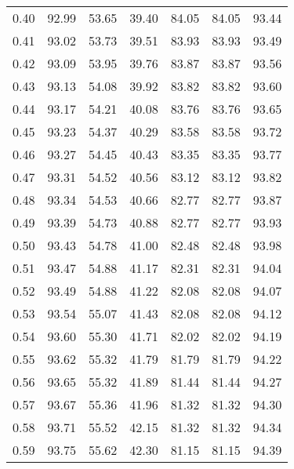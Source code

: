 \begin{tabular}{|c|c|c|c|c|c|c|}
      0.40 &     92.99 &     53.65 &      39.40 &   84.05 &      84.05 &         93.44 \\
      0.41 &     93.02 &     53.73 &      39.51 &   83.93 &      83.93 &         93.49 \\
      0.42 &     93.09 &     53.95 &      39.76 &   83.87 &      83.87 &         93.56 \\
      0.43 &     93.13 &     54.08 &      39.92 &   83.82 &      83.82 &         93.60 \\
      0.44 &     93.17 &     54.21 &      40.08 &   83.76 &      83.76 &         93.65 \\
      0.45 &     93.23 &     54.37 &      40.29 &   83.58 &      83.58 &         93.72 \\
      0.46 &     93.27 &     54.45 &      40.43 &   83.35 &      83.35 &         93.77 \\
      0.47 &     93.31 &     54.52 &      40.56 &   83.12 &      83.12 &         93.82 \\
      0.48 &     93.34 &     54.53 &      40.66 &   82.77 &      82.77 &         93.87 \\
      0.49 &     93.39 &     54.73 &      40.88 &   82.77 &      82.77 &         93.93 \\
      0.50 &     93.43 &     54.78 &      41.00 &   82.48 &      82.48 &         93.98 \\
      0.51 &     93.47 &     54.88 &      41.17 &   82.31 &      82.31 &         94.04 \\
      0.52 &     93.49 &     54.88 &      41.22 &   82.08 &      82.08 &         94.07 \\
      0.53 &     93.54 &     55.07 &      41.43 &   82.08 &      82.08 &         94.12 \\
      0.54 &     93.60 &     55.30 &      41.71 &   82.02 &      82.02 &         94.19 \\
      0.55 &     93.62 &     55.32 &      41.79 &   81.79 &      81.79 &         94.22 \\
      0.56 &     93.65 &     55.32 &      41.89 &   81.44 &      81.44 &         94.27 \\
      0.57 &     93.67 &     55.36 &      41.96 &   81.32 &      81.32 &         94.30 \\
      0.58 &     93.71 &     55.52 &      42.15 &   81.32 &      81.32 &         94.34 \\
      0.59 &     93.75 &     55.62 &      42.30 &   81.15 &      81.15 &         94.39 \\

\end{tabular}
